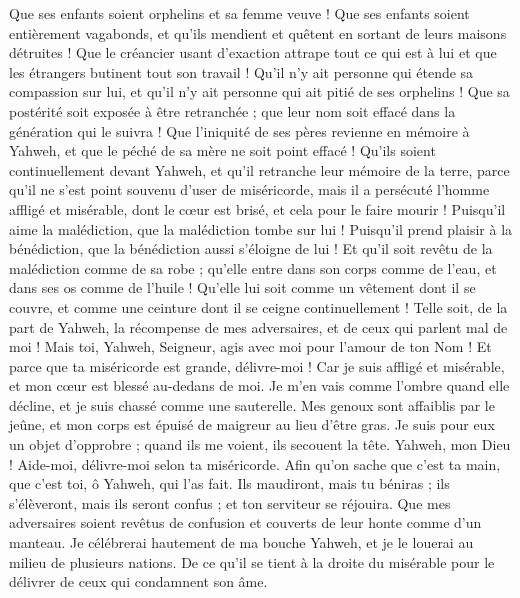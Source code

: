 \begin{multicols}{2}
Que ses enfants soient orphelins et sa femme veuve !
Que ses enfants soient entièrement vagabonds, et qu'ils mendient et quêtent en sortant de leurs maisons détruites !
Que le créancier usant d'exaction attrape tout ce qui est à lui et que les étrangers butinent tout son travail !
Qu'il n'y ait personne qui étende sa compassion sur lui, et qu'il n'y ait personne qui ait pitié de ses orphelins !
Que sa postérité soit exposée à être retranchée ; que leur nom soit effacé dans la génération qui le suivra !
Que l'iniquité de ses pères revienne en mémoire à Yahweh, et que le péché de sa mère ne soit point effacé !
Qu'ils soient continuellement devant Yahweh, et qu'il retranche leur mémoire de la terre,
parce qu'il ne s'est point souvenu d'user de miséricorde, mais il a persécuté l'homme affligé et misérable, dont le cœur est brisé, et cela pour le faire mourir !
Puisqu'il aime la malédiction, que la malédiction tombe sur lui ! Puisqu’il prend plaisir à la bénédiction, que la bénédiction aussi s'éloigne de lui !
Et qu'il soit revêtu de la malédiction comme de sa robe ; qu'elle entre dans son corps comme de l'eau, et dans ses os comme de l'huile !
Qu'elle lui soit comme un vêtement dont il se couvre, et comme une ceinture dont il se ceigne continuellement !
Telle soit, de la part de Yahweh, la récompense de mes adversaires, et de ceux qui parlent mal de moi !
Mais toi, Yahweh, Seigneur, agis avec moi pour l'amour de ton Nom ! Et parce que ta miséricorde est grande, délivre-moi !
Car je suis affligé et misérable, et mon cœur est blessé au-dedans de moi.
Je m'en vais comme l'ombre quand elle décline, et je suis chassé comme une sauterelle.
Mes genoux sont affaiblis par le jeûne, et mon corps est épuisé de maigreur au lieu d’être gras.
Je suis pour eux un objet d’opprobre ; quand ils me voient, ils secouent la tête.
Yahweh, mon Dieu ! Aide-moi, délivre-moi selon ta miséricorde.
Afin qu'on sache que c’est ta main, que c’est toi, ô Yahweh, qui l’as fait.
Ils maudiront, mais tu béniras ; ils s'élèveront, mais ils seront confus ; et ton serviteur se réjouira.
Que mes adversaires soient revêtus de confusion et couverts de leur honte comme d'un manteau.
Je célébrerai hautement de ma bouche Yahweh, et je le louerai au milieu de plusieurs nations.
De ce qu'il se tient à la droite du misérable pour le délivrer de ceux qui condamnent son âme.

\end{multicols}
